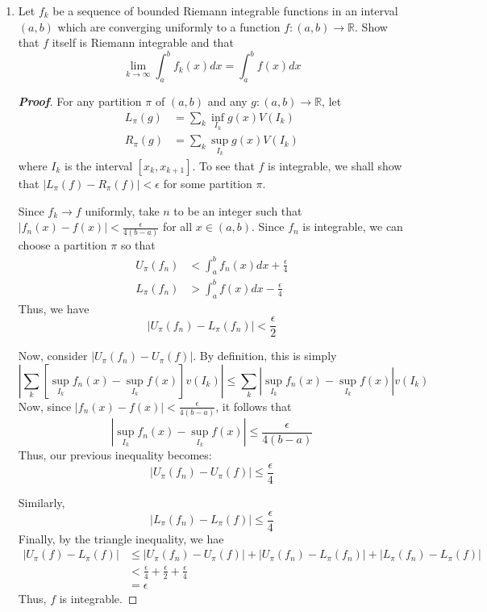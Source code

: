 \documentclass[12pt,leqno]{book}
\theoremstyle{definition}
\newcommand{\R}{\mathbb{R}}
\newenvironment{Proof}{\begin{proof}[\textnormal{\textbf{Proof}}]}{\end{proof}}
\begin{document}
\begin{enumerate}
\begin{Proof}
\begin{enumerate}
A similar argument shows that \[\left|\liminf_{h\to0}{\frac{F(x+h)-F(x)}{h}}\right|<1\] 

To see uniform continuity, notice that \begin{align*}\left|F(x)-F(y)\right|&=\left|\int_x^yf(t)dt\right|\\&\leq\int_x^y|f(t)|dt\leq |y-x|\end{align*} Thus, for every $\epsilon>0$, take $\delta=\epsilon$, and the result follows.$\qedhere$ 
 \end{enumerate}

\end{Proof}
\item Let $f_k$ be a sequence of bounded Riemann integrable functions in an interval $(a,b)$ which are converging uniformly to a function $f:(a,b)\to\mathbb{R}$. Show that $f$ itself is Riemann integrable and that \[\lim_{k\to\infty}\int_a^bf_k(x)dx=\int_a^bf(x)dx\]
\begin{Proof}
 For any partition $\pi$ of $(a,b)$ and any $g:(a,b)\to\mathbb{R}$, let \begin{align*}L_{\pi}(g)&=\sum_k\inf_{I_k}g(x)V(I_k)\\R_{\pi}(g)&=\sum_k\sup_{I_k}g(x)V(I_k)\end{align*} where $I_k$ is the interval $[x_k,x_{k+1}]$. To see that $f$ is integrable, we shall show that $|L_{\pi}(f)-R_{\pi}(f)|<\epsilon$ for some partition $\pi$. 

Since $f_k\to f$ uniformly, take $n$ to be an integer such that $|f_n(x)-f(x)|<\frac{\epsilon}{4(b-a)}$ for all $x\in(a,b)$. Since $f_n$ is integrable, we can choose a partition $\pi$ so that \begin{align*}U_{\pi}(f_n)&<\int_a^bf_n(x)dx+\frac{\epsilon}{4}\\L_{\pi}(f_n)&>\int_a^bf(x)dx-\frac{\epsilon}{4}\end{align*} Thus, we have \[\left|U_{\pi}(f_n)-L_{\pi}(f_n)\right|<\frac{\epsilon}{2}\] 

Now, consider $|U_{\pi}(f_n)-U_{\pi}(f)|$. By definition, this is simply \[\left|\sum_k\left[\sup_{I_k}f_n(x)-\sup_{I_k}f(x)\right]v(I_k)\right|\leq\sum_k\left|\sup_{I_k}f_n(x)-\sup_{I_k}f(x)\right|v(I_k)\] Now, since $|f_n(x)-f(x)|<\frac{\epsilon}{4(b-a)}$, it follows that \[\left|\sup_{I_k}f_n(x)-\sup_{I_k}f(x)\right|\leq\frac{\epsilon}{4(b-a)}\] Thus, our previous inequality becomes: \[\left|U_{\pi}(f_n)-U_{\pi}(f)\right|\leq\frac{\epsilon}{4}\]

Similarly, \[|L_{\pi}(f_n)-L_{\pi}(f)|\leq\frac{\epsilon}{4}\] Finally, by the triangle inequality, we hae \begin{align*}\left|U_{\pi}(f)-L_{\pi}(f)\right|&\leq\left|U_{\pi}(f_n)-U_{\pi}(f)\right|+\left|U_{\pi}(f_n)-L_{\pi}(f_n)\right|+\left|L_{\pi}(f_n)-L_{\pi}(f)\right|\\&<\frac{\epsilon}{4}+\frac{\epsilon}{2}+\frac{\epsilon}{4}\\&=\epsilon\end{align*} Thus, $f$ is integrable.


\end{Proof}
\end{enumerate}
\end{document}
